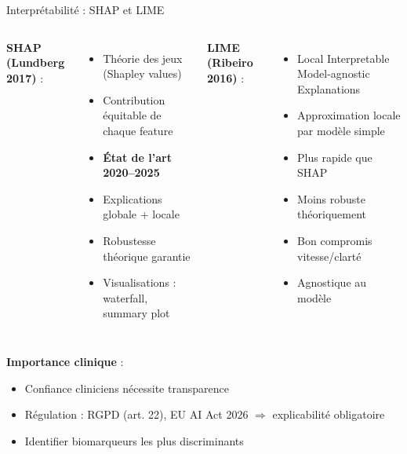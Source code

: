 \documentclass[11pt, aspectratio=169]{beamer}
\begin{document}
\begin{frame}{Interprétabilité : SHAP et LIME}
  \begin{columns}[T]
    \textbf{\color{accent2} SHAP (Lundberg 2017)} :
    \begin{itemize}
      \item Théorie des jeux (Shapley values)
      \item Contribution équitable de chaque feature
      \item \textbf{État de l'art 2020--2025}
      \item Explications globale + locale
      \item Robustesse théorique garantie
      \item Visualisations : waterfall, summary plot
    \end{itemize}
    
    \textbf{\color{accent2} LIME (Ribeiro 2016)} :
    \begin{itemize}
      \item Local Interpretable Model-agnostic Explanations
      \item Approximation locale par modèle simple
      \item Plus rapide que SHAP
      \item Moins robuste théoriquement
      \item Bon compromis vitesse/clarté
      \item Agnostique au modèle
    \end{itemize}
  \end{columns}
  
  \vspace{1em}
  
  \textbf{\textcolor{accent1}{Importance clinique}} :
  \begin{itemize}
    \item Confiance cliniciens nécessite transparence
    \item Régulation : RGPD (art. 22), EU AI Act 2026 $\Rightarrow$ explicabilité obligatoire
    \item Identifier biomarqueurs les plus discriminants
  \end{itemize}
\end{frame}
\end{document}
